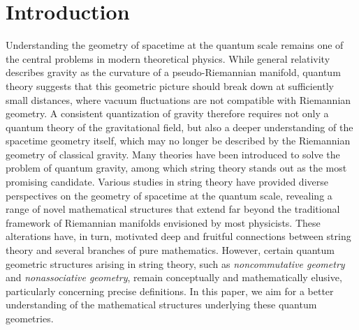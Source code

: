 \documentclass[reqno]{amsart}
\theoremstyle{definition}
\theoremstyle{remark}
\begin{document}
	\section*{Introduction}
    Understanding the geometry of spacetime at the quantum scale remains one of the central problems in modern theoretical physics. While general relativity describes gravity as the curvature of a pseudo-Riemannian manifold, quantum theory suggests that this geometric picture should break down at sufficiently small distances, where vacuum fluctuations are not compatible with Riemannian geometry. A consistent quantization of gravity therefore requires not only a quantum theory of the gravitational field, but also a deeper understanding of the spacetime geometry itself, which may no longer be described by the Riemannian geometry of classical gravity. Many theories have been introduced to solve the problem of quantum gravity, among which string theory stands out as the most promising candidate. Various studies in string theory have provided diverse perspectives on the geometry of spacetime at the quantum scale, revealing a range of novel mathematical structures that extend far beyond the traditional framework of Riemannian manifolds envisioned by most physicists. These alterations have, in turn, motivated deep and fruitful connections between string theory and several branches of pure mathematics. However, certain quantum geometric structures arising in string theory, such as \textit{noncommutative geometry} and \textit{nonassociative geometry}, remain conceptually and mathematically elusive, particularly concerning precise definitions. In this paper, we aim for a better understanding of the mathematical structures underlying these quantum geometries.
    
\end{document}
